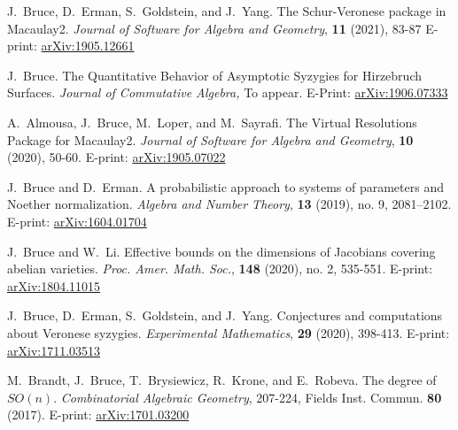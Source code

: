 \documentclass[letterpaper,11pt]{article}
\begin{document}
\begin{revnumerate}[15]
\item
	J.~Bruce, D.~Erman, S.~Goldstein, and J.~Yang. The Schur-Veronese package in Macaulay2.  {\it Journal of Software for Algebra and Geometry}, \textbf{11} (2021), 83-87 E-print: \hyperref{https://arxiv.org/abs/1905.12661}{}{}{arXiv:1905.12661} \vspace{-6pt} 
	
\item
	J.~Bruce. The Quantitative Behavior of Asymptotic Syzygies for Hirzebruch Surfaces. {\it Journal of Commutative Algebra,} To appear. E-Print:  \hyperref{http://arxiv.org/abs/1906.07333}{}{}{arXiv:1906.07333} \vspace{-6pt}
	
\item
	A.~Almousa, J.~Bruce, M.~Loper, and M.~Sayrafi. The Virtual Resolutions Package for Macaulay2.  {\it Journal of Software for Algebra and Geometry}, \textbf{10} (2020), 50-60. E-print: \hyperref{http://arxiv.org/abs/1905.07022}{}{}{arXiv:1905.07022} \vspace{-6pt}
	
\item
	J.~Bruce and D.~Erman. A probabilistic approach to systems of parameters and Noether normalization. {\it Algebra and Number Theory}, \textbf{13} (2019), no. 9, 2081–2102. E-print: \hyperref{http://arxiv.org/abs/1604.01704}{}{}{arXiv:1604.01704} \vspace{-6pt}
	
\item
	J.~Bruce and W.~Li. Effective bounds on the dimensions of Jacobians covering abelian varieties.  {\it Proc. Amer. Math. Soc.}, \textbf{148} (2020), no. 2, 535-551. E-print: \hyperref{https://arxiv.org/abs/1804.11015}{}{}{arXiv:1804.11015} \vspace{-6pt}
			
\item
	J.~Bruce, D.~Erman, S.~Goldstein, and J.~Yang. Conjectures and computations about Veronese syzygies.  {\it Experimental Mathematics}, \textbf{29} (2020), 398-413. E-print: \hyperref{https://arxiv.org/abs/1711.03513}{}{}{arXiv:1711.03513} \vspace{-6pt}
	
\item
	M.~Brandt, J.~Bruce, T.~Brysiewicz, R.~Krone, and E.~Robeva. The degree of $SO(n)$. {\it Combinatorial Algebraic Geometry}, 207-224, Fields Inst. Commun. \textbf{80} (2017). E-print: \hyperref{https://arxiv.org/abs/1701.03200}{}{}{arXiv:1701.03200} \vspace{-6pt}
	

\end{revnumerate}
\end{document}
